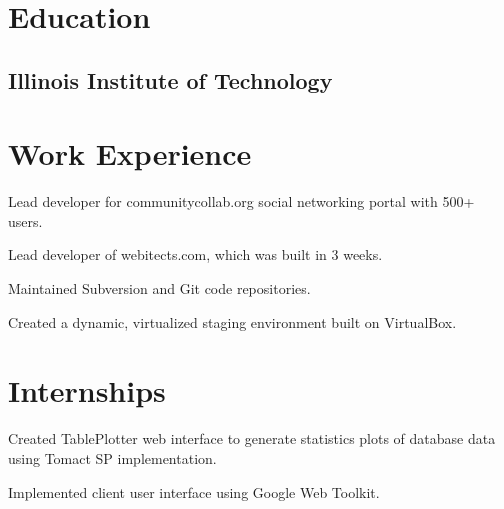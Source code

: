 \documentclass{resume}
\begin{document}
\author{Dmitry Ratnikov}
\maketitle

\section{Education}

\subsection{Illinois Institute of Technology}


\section{Work Experience}

\begin{compactitem}
  \item Lead developer for communitycollab.org social networking portal with 500+ users.
  \item Lead developer of webitects.com, which was built in 3 weeks.
  \item Maintained Subversion and Git code repositories.
  \item Created a dynamic, virtualized staging environment built on VirtualBox.
\end{compactitem}

\section{Internships}

\begin{compactitem}
  \item Created TablePlotter web interface to generate statistics plots of database data using Tomact SP implementation.
  \item Implemented client user interface using Google Web Toolkit.
\end{compactitem}
\end{document}
